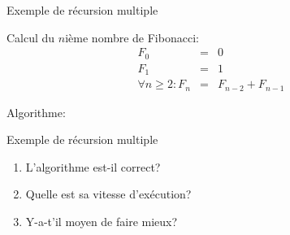 \begin{frame}{Exemple de récursion multiple}

Calcul du $n$ième nombre de Fibonacci:
\begin{eqnarray*}
F_0&=&0\\
F_1&=&1\\
\forall n\geq 2: F_n& = &F_{n-2}+F_{n-1}
\end{eqnarray*}

Algorithme:
\begin{center}
\end{center}

\end{frame}

\begin{frame}{Exemple de récursion multiple}

\begin{center}
\end{center}

\bigskip

\begin{enumerate}
\item L'algorithme est-il correct?
\item Quelle est sa vitesse d'exécution?
\item Y-a-t'il moyen de faire mieux?
\end{enumerate}

\end{frame}

